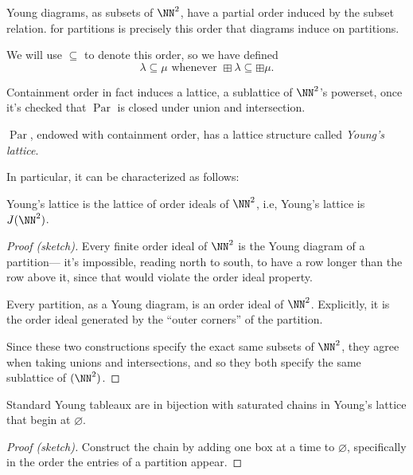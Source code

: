 \documentclass{article}
\DeclareMathOperator{\Par}{Par}
\begin{document}
\begin{definition}
    Young diagrams, as subsets of $\NN^2$, have a partial order induced by the subset relation. 
     for partitions is precisely this order that diagrams induce on partitions.

    We will use $\subseteq$ to denote this order, so we have defined
    \[
        \lambda \subseteq \mu \text{ whenever } \boxplus \lambda \subseteq \boxplus \mu.
    \]
\end{definition}

Containment order in fact induces a lattice, a sublattice of $\NN^2$'s powerset, once it's checked that $\Par$ is closed under union and intersection. 

\begin{remark}
    $\Par$, endowed with containment order, has a lattice structure called \textit{Young's lattice}.
\end{remark}

In particular, it can be characterized as follows:

\begin{theorem}
    Young's lattice is the lattice of order ideals of $\NN^2$, i.e, Young's lattice is $J(\NN^2)$.
\end{theorem}

\begin{proof}[Proof (sketch)]
    Every finite order ideal of $\NN^2$ is the Young diagram of a partition--- it's impossible, reading north to south, to have a row longer than the row above it, since that would violate the order ideal property.

    Every partition, as a Young diagram, is an order ideal of $\NN^2$.
    Explicitly, it is the order ideal generated by the ``outer corners'' of the partition.

    Since these two constructions specify the exact same subsets of $\NN^2$, they agree when taking unions and intersections, and so they both specify the same sublattice of $(\NN^2)$.
\end{proof}

\begin{theorem}
    Standard Young tableaux are in bijection with saturated chains in Young's lattice that begin at $\varnothing$.
\end{theorem}

\begin{proof}[Proof (sketch)]
    Construct the chain by adding one box at a time to $\varnothing$, specifically in the order the entries of a partition appear.
\end{proof}
\end{document}

